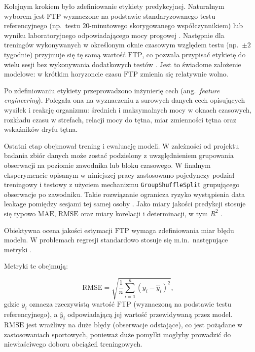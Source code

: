 Kolejnym krokiem było zdefiniowanie etykiety predykcyjnej.
Naturalnym wyborem jest $\mathrm{FTP}$ wyznaczone na podstawie standaryzowanego testu referencyjnego (np.\ testu $20$-minutowego skorygowanego współczynnikiem) lub wyniku laboratoryjnego odpowiadającego mocy progowej \parencite{borszcz2018ftp,karsten2021cpftp,denham2020predictftp}.
Następnie dla treningów wykonywanych w określonym oknie czasowym względem testu (np.\ $\pm 2$ tygodnie) przyjmuje się tę samą wartość $\mathrm{FTP}$, co pozwala przypisać etykietę do wielu sesji bez wykonywania dodatkowych testów \parencite{stockwell2023mlftp,denham2020predictftp}.
Jest to świadome założenie modelowe: w krótkim horyzoncie czasu $\mathrm{FTP}$ zmienia się relatywnie wolno.

Po zdefiniowaniu etykiety przeprowadzono inżynierię cech (ang.\ \textit{feature engineering}).
Polegała ona na wyznaczeniu z surowych danych cech opisujących wysiłek i reakcję organizmu: średnich i maksymalnych mocy w oknach czasowych, rozkładu czasu w strefach, relacji mocy do tętna, miar zmienności tętna oraz wskaźników dryfu tętna.

Ostatni etap obejmował trening i ewaluację modeli.
W zależności od projektu badania zbiór danych może zostać podzielony z uwzględnieniem grupowania obserwacji na poziomie zawodnika lub bloku czasowego.
W finalnym eksperymencie opisanym w niniejszej pracy zastosowano pojedynczy podział treningowy i testowy z użyciem mechanizmu \texttt{GroupShuffleSplit} grupującego obserwacje po zawodniku. Takie rozwiązanie ogranicza ryzyko wystąpienia data leakage pomiędzy sesjami tej samej osoby \parencite{tougui2021crossValidation,rosenblatt2024leakage}.
Jako miary jakości predykcji stosuje się typowo $\mathrm{MAE}$, $\mathrm{RMSE}$ oraz miary korelacji i determinacji, w tym $R^2$ \parencite{chai2014rmseMae,james2021isl,hastie2009esl}.

Obiektywna ocena jakości estymacji $\mathrm{FTP}$ wymaga zdefiniowania miar błędu modelu.
W problemach regresji standardowo stosuje się m.in.\ następujące metryki \parencite{james2021isl,hastie2009esl}.

Metryki te obejmują:

\begin{equation}
\label{eq:rmse}
\mathrm{RMSE} = \sqrt{\frac{1}{n}\sum_{i=1}^{n}\left(y_i - \hat{y}_i\right)^2},
\end{equation}
gdzie $y_i$ oznacza rzeczywistą wartość $\mathrm{FTP}$ (wyznaczoną na podstawie testu referencyjnego), a $\hat{y}_i$ odpowiadającą jej wartość przewidywaną przez model.
$\mathrm{RMSE}$ jest wrażliwy na duże błędy (obserwacje odstające), co jest pożądane w zastosowaniach sportowych, ponieważ duże pomyłki mogłyby prowadzić do niewłaściwego doboru obciążeń treningowych.

